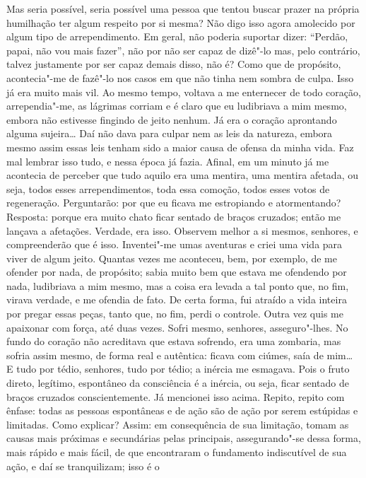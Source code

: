 Mas seria possível, seria possível uma pessoa que tentou buscar prazer
na própria humilhação ter algum respeito por si mesma? Não digo isso
agora amolecido por algum tipo de arrependimento. Em geral, não poderia
suportar dizer: ``Perdão, papai, não vou mais fazer'', não por não ser
capaz de dizê"-lo mas, pelo contrário, talvez justamente por ser capaz
demais disso, não é? Como que de propósito, acontecia"-me de fazê"-lo nos
casos em que não tinha nem sombra de culpa. Isso já era muito mais vil.
Ao mesmo tempo, voltava a me enternecer de todo coração, arrependia"-me,
as lágrimas corriam e é claro que eu ludibriava a mim mesmo, embora não
estivesse fingindo de jeito nenhum. Já era o coração aprontando alguma
sujeira\ldots{} Daí não dava para culpar nem as leis da natureza, embora
mesmo assim essas leis tenham sido a maior causa de ofensa da minha
vida. Faz mal lembrar isso tudo, e nessa época já fazia. Afinal, em um
minuto já me acontecia de perceber que tudo aquilo era uma mentira, uma
mentira afetada, ou seja, todos esses arrependimentos, toda essa
comoção, todos esses votos de regeneração. Perguntarão: por que eu
ficava me estropiando e atormentando? Resposta: porque era muito chato
ficar sentado de braços cruzados; então me lançava a afetações. Verdade,
era isso. Observem melhor a si mesmos, senhores, e compreenderão que é
isso. Inventei"-me umas aventuras e criei uma vida para viver de algum
jeito. Quantas vezes me aconteceu, bem, por exemplo, de me ofender por
nada, de propósito; sabia muito bem que estava me ofendendo por nada,
ludibriava a mim mesmo, mas a coisa era levada a tal ponto que, no fim,
virava verdade, e me ofendia de fato. De certa forma, fui atraído a vida
inteira por pregar essas peças, tanto que, no fim, perdi o controle.
Outra vez quis me apaixonar com força, até duas vezes. Sofri mesmo,
senhores, asseguro"-lhes. No fundo do coração não acreditava que estava
sofrendo, era uma zombaria, mas sofria assim mesmo, de forma real e
autêntica: ficava com ciúmes, saía de mim\ldots{} E tudo por tédio, senhores,
tudo por tédio; a inércia me esmagava. Pois o fruto direto, legítimo,
espontâneo da consciência é a inércia, ou seja, ficar sentado de braços
cruzados conscientemente. Já mencionei isso acima. Repito, repito com
ênfase: todas as pessoas espontâneas e de ação são de ação por serem
estúpidas e limitadas. Como explicar? Assim: em consequência de sua
limitação, tomam as causas mais próximas e secundárias pelas principais,
assegurando"-se dessa forma, mais rápido e mais fácil, de que encontraram
o fundamento indiscutível de sua ação, e daí se tranquilizam; isso é o
